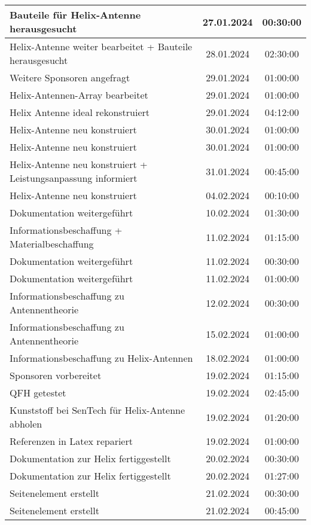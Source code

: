 \begin{longtable}{|l|c|c|}
	\hline
	Bauteile für Helix-Antenne herausgesucht & 27.01.2024 & 00:30:00 \\
	\hline
	Helix-Antenne weiter bearbeitet + Bauteile herausgesucht & 28.01.2024 & 02:30:00 \\
	\hline
	Weitere Sponsoren angefragt & 29.01.2024 & 01:00:00 \\
	\hline
	Helix-Antennen-Array bearbeitet & 29.01.2024 & 01:00:00 \\
	\hline
	Helix Antenne ideal rekonstruiert & 29.01.2024 & 04:12:00 \\
	\hline
	Helix-Antenne neu konstruiert & 30.01.2024 & 01:00:00 \\
	\hline
	Helix-Antenne neu konstruiert & 30.01.2024 & 01:00:00 \\
	\hline
	Helix-Antenne neu konstruiert + Leistungsanpassung informiert & 31.01.2024 & 00:45:00 \\
	\hline
	Helix-Antenne neu konstruiert & 04.02.2024 & 00:10:00 \\
	\hline
	Dokumentation weitergeführt & 10.02.2024 & 01:30:00 \\
	\hline
	Informationsbeschaffung + Materialbeschaffung & 11.02.2024 & 01:15:00 \\
	\hline
	Dokumentation weitergeführt & 11.02.2024 & 00:30:00 \\
	\hline
	Dokumentation weitergeführt & 11.02.2024 & 01:00:00 \\
	\hline
	Informationsbeschaffung zu Antennentheorie & 12.02.2024 & 00:30:00 \\
	\hline
	Informationsbeschaffung zu Antennentheorie & 15.02.2024 & 01:00:00 \\
	\hline
	Informationsbeschaffung zu Helix-Antennen & 18.02.2024 & 01:00:00 \\
	\hline
	Sponsoren vorbereitet & 19.02.2024 & 01:15:00 \\
	\hline
	QFH getestet & 19.02.2024 & 02:45:00 \\
	\hline
	Kunststoff bei SenTech für Helix-Antenne abholen & 19.02.2024 & 01:20:00 \\
	\hline
	Referenzen in Latex repariert & 19.02.2024 & 01:00:00 \\
	\hline
	Dokumentation zur Helix fertiggestellt & 20.02.2024 & 00:30:00 \\
	\hline
	Dokumentation zur Helix fertiggestellt & 20.02.2024 & 01:27:00 \\
	\hline
	Seitenelement erstellt & 21.02.2024 & 00:30:00 \\
	\hline
	Seitenelement erstellt & 21.02.2024 & 00:45:00 \\

\end{longtable}

